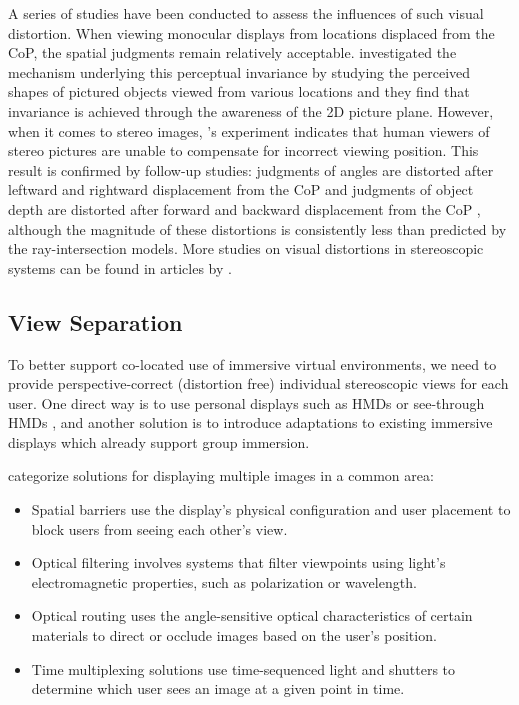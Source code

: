 A series of studies have been conducted to assess the influences of such visual distortion. When viewing monocular displays from locations displaced from the CoP, the spatial judgments remain relatively acceptable. \citet{Vishwanath2005Pictures} investigated the mechanism underlying this perceptual invariance by studying the perceived shapes of pictured objects viewed from various locations and they find that invariance is achieved through the awareness of the 2D picture plane. However, when it comes to stereo images, \citet{Banks2009Perception}'s experiment indicates that human viewers of stereo pictures are unable to compensate for incorrect viewing position. This result is confirmed by follow-up studies: judgments of angles are distorted after leftward and rightward displacement from the CoP \citep{Burton2012Diagnosing} and judgments of object depth are distorted after forward and backward displacement from the CoP \citep{Pollock2012Right}, although the magnitude of these distortions is consistently less than predicted by the ray-intersection models. More studies on visual distortions in stereoscopic systems can be found in articles by \citet{Woods1993Image, Held2008Misperceptions, Ponto2013Perceptual}.


\subsection{View Separation}
To better support co-located use of immersive virtual environments, we need to provide perspective-correct (distortion free) individual stereoscopic views for each user. One direct way is to use personal displays such as HMDs \citep{Salzmann2008TUS} or see-through HMDs \citep{Schmalstieg2002Stube}, and another solution is to introduce adaptations to existing immersive displays which already support group immersion.

\citet{Bolas2004New} categorize solutions for displaying multiple images in a common area:

\begin{itemize}
\item Spatial barriers use the display's physical configuration and user placement to block users from seeing each other's view.
\item Optical filtering involves systems that filter viewpoints using light's electromagnetic properties, such as polarization or wavelength.
\item Optical routing uses the angle-sensitive optical characteristics of certain materials to direct or occlude images based on the user's position.
\item Time multiplexing solutions use time-sequenced light and shutters to determine which user sees an image at a given point in time.
\end{itemize}

